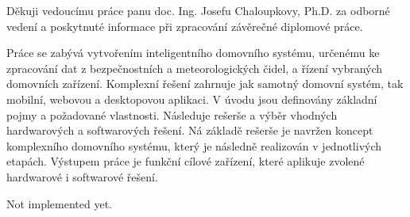 \documentclass[FM,DP]{tulthesis}  %
\begin{document}


\begin{acknowledgement}
Děkuji vedoucímu práce panu doc. Ing. Josefu Chaloupkovy, Ph.D. za odborné vedení a poskytnuté informace při zpracování závěrečné diplomové práce.
\end{acknowledgement}


\begin{abstractCZ}
Práce se zabývá vytvořením inteligentního domovního systému, určenému ke zpracování dat z bezpečnostních a meteorologických čidel, a řízení vybraných domovních zařízení. Komplexní řešení zahrnuje jak samotný domovní systém, tak mobilní, webovou a desktopovou aplikaci. V úvodu jsou definovány základní pojmy a požadované vlastnosti. Následuje rešerše a výběr vhodných hardwarových a softwarových řešení. Ná základě rešerše je navržen koncept komplexního domovního systému, který je následně realizován v jednotlivých etapách. Výstupem práce je funkční cílové zařízení, které aplikuje zvolené hardwarové i softwarové řešení.

\end{abstractCZ}

\vspace{2cm}

\begin{abstractEN}
Not implemented yet.
\end{abstractEN}


\tableofcontents
\clearpage
\end{document}
